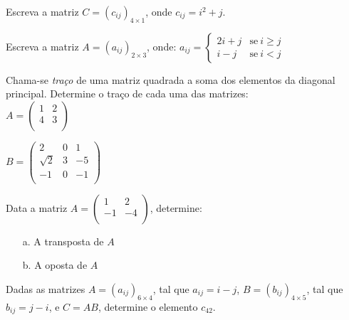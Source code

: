 \documentclass[pdftex, brazil, 12pt, oneside, addpoints]{exam}
\begin{document}
\newpage

\begin{questions}
\setlength\linefillthickness{0.2pt}

\question
Escreva a matriz $C = (c_{ij})_{4 \times 1}$, onde $c_{ij} = i^2 + j$.

\question
Escreva a matriz $A = (a_{ij})_{2 \times 3}$, onde:
$a_{ij} =
    \begin{cases}
      2i + j & \text{se}\ i \ge j\\
      i - j  & \text{se}\ i < j
    \end{cases}
$

\question
Chama-se \emph{traço} de uma matriz quadrada a soma dos elementos da
diagonal principal. Determine o traço de cada uma das matrizes:\\%
$A = \begin{pmatrix}
  1 & 2\\
  4 & 3\\
\end{pmatrix}$

$B = \begin{pmatrix}
  2 & 0 & 1\\
  \sqrt{2} & 3 & -5\\
  -1 & 0 & -1\\
\end{pmatrix}$

\question
Data a matriz
$A = \begin{pmatrix}
  1 & 2\\
  -1 & -4\\
\end{pmatrix}$, determine:
\begin{itemize}
\item[a.] A transposta de $A$
\item[b.] A oposta de $A$
\end{itemize}

\question
Dadas as matrizes $A = (a_{ij})_{6 \times 4}$, tal que $a_{ij} = i - j$, $B = (b_{ij})_{4 \times 5}$,
tal que $b_{ij} = j - i$, e $C = AB$, determine o elemento $c_{42}$.



\end{questions}
\end{document}
